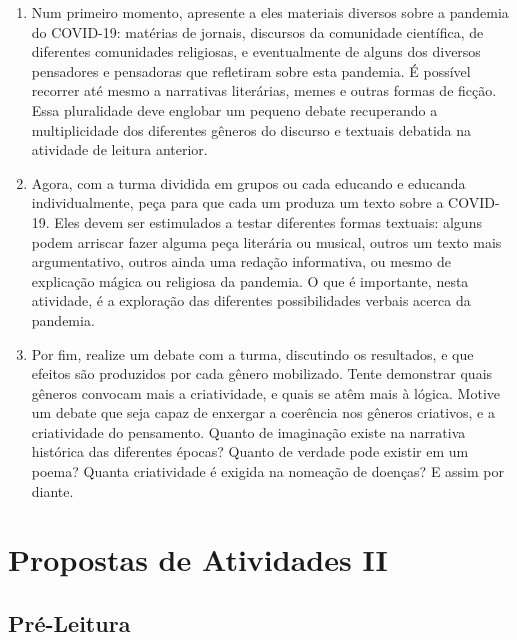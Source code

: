 \documentclass[12pt]{extarticle}
\begin{document}
\begin{enumerate}
\item Num primeiro momento, apresente a eles materiais diversos sobre a
pandemia do COVID-19: matérias de jornais, discursos da comunidade
científica, de diferentes comunidades religiosas, e eventualmente de
alguns dos diversos pensadores e pensadoras que refletiram sobre esta
pandemia. É possível recorrer até mesmo a narrativas literárias, memes e
outras formas de ficção. Essa pluralidade deve englobar um pequeno
debate recuperando a multiplicidade dos diferentes gêneros do discurso e
textuais debatida na atividade de leitura anterior.

\item Agora, com a turma dividida em grupos ou cada educando e educanda
individualmente, peça para que cada um produza um texto sobre a
COVID-19. Eles devem ser estimulados a testar diferentes formas
textuais: alguns podem arriscar fazer alguma peça literária ou musical,
outros um texto mais argumentativo, outros ainda uma redação
informativa, ou mesmo de explicação mágica ou religiosa da pandemia. O
que é importante, nesta atividade, é a exploração das diferentes
possibilidades verbais acerca da pandemia.

\item Por fim, realize um debate com a turma, discutindo os resultados, e que
efeitos são produzidos por cada gênero mobilizado. Tente demonstrar
quais gêneros convocam mais a criatividade, e quais se atêm mais à
lógica. Motive um debate que seja capaz de enxergar a coerência nos
gêneros criativos, e a criatividade do pensamento. Quanto de imaginação
existe na narrativa histórica das diferentes épocas? Quanto de verdade
pode existir em um poema? Quanta criatividade é exigida na nomeação de
doenças? E assim por diante.
\end{enumerate}


\section{Propostas de Atividades II}


\subsection{Pré-Leitura}

\end{document}
